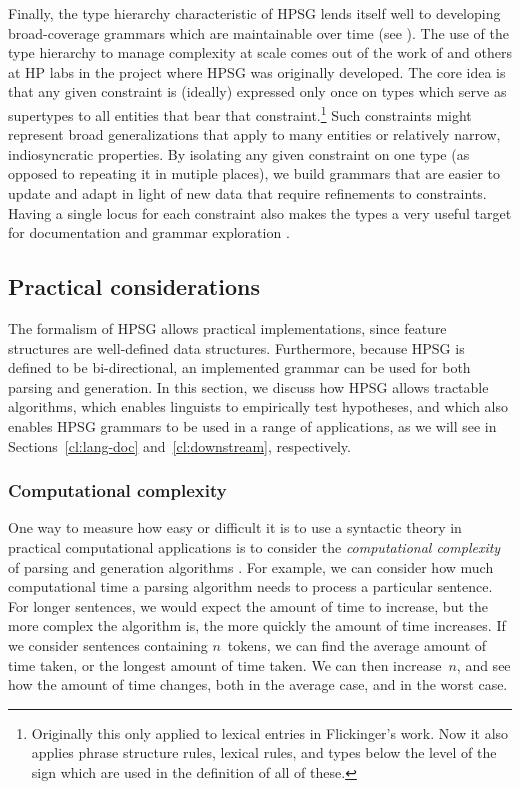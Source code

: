 \documentclass[output=paper,nonflat]{langsci/langscibook}
\begin{document}
Finally, the type hierarchy characteristic of HPSG lends itself well to developing broad-coverage grammars which are maintainable over time (see \citealt{Syg:Win:11}). The use of the type hierarchy to manage complexity at scale comes out of the work of \citet{Flickinger87} and others at HP labs in the project where HPSG was originally developed. The core idea is that any given constraint is (ideally) expressed only once on types which serve as supertypes to all entities that bear that constraint.\footnote{Originally this only applied to lexical entries in Flickinger's work. Now it also applies phrase structure rules, lexical rules, and types below the level of the sign which are used in the definition of all of these.} Such constraints might represent broad generalizations that apply to many entities or relatively narrow, indiosyncratic properties. By isolating any given constraint on one type (as opposed to repeating it in mutiple places), we build grammars that are easier to update and adapt in light of new data that require refinements to constraints. Having a single locus for each constraint also makes the types a very useful target for documentation \citep{Hashimoto-etal:07} and grammar exploration \citep{Letcher:18}. 


\subsection{Practical considerations}
\label{cl:prac}

The formalism of HPSG allows practical implementations,
since feature structures are well-defined data structures.
Furthermore, because HPSG is defined to be bi-directional,
an implemented grammar can be used for both parsing and generation.
In this section, we discuss how HPSG allows tractable algorithms,
which enables linguists to empirically test hypotheses,
and which also enables HPSG grammars to be used in a range of applications,
as we will see in Sections~\ref{cl:lang-doc} and~\ref{cl:downstream}, respectively.

\subsubsection{Computational complexity}
\label{cl:prac:comp}

One way to measure how easy or difficult it is to use a syntactic theory in practical computational applications
is to consider the \textit{computational complexity} of parsing and generation algorithms \citep{gazdar1985complexity}.
For example, we can consider how much computational time
a parsing algorithm needs to process a particular sentence.
For longer sentences, we would expect the amount of time to increase,
but the more complex the algorithm is,
the more quickly the amount of time increases.
If we consider sentences containing $n$~tokens,
we can find the average amount of time taken,
or the longest amount of time taken.
We can then increase~$n$, and see how the amount of time changes,
both in the average case, and in the worst case.
\end{document}
